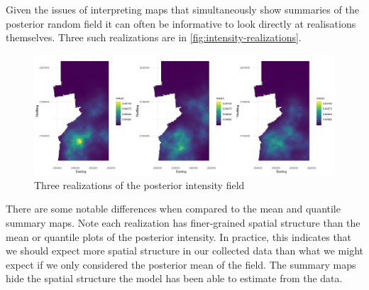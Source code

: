 \documentclass[preprint,12pt]{elsarticle}
\begin{document}
Given the issues of interpreting maps that simultaneously show summaries of the posterior random field it can often be informative to look directly at realisations themselves. Three such realizations are in \autoref{fig:intensity-realizations}.  
\begin{figure}
	\includegraphics[scale=0.35]{figures/intensity_realized.png}
	\caption{Three realizations of the posterior intensity field}
	\label{fig:intensity-realizations}
\end{figure}
There are some notable differences when compared to the mean and quantile summary maps.  Note each realization has finer-grained spatial structure than the mean or quantile plots of the posterior intensity.  In practice, this indicates that we should expect more spatial structure in our collected data than what we might expect if we only considered the posterior mean of the field.  The summary maps hide the spatial structure the model has been able to estimate from the data.
\end{document}
